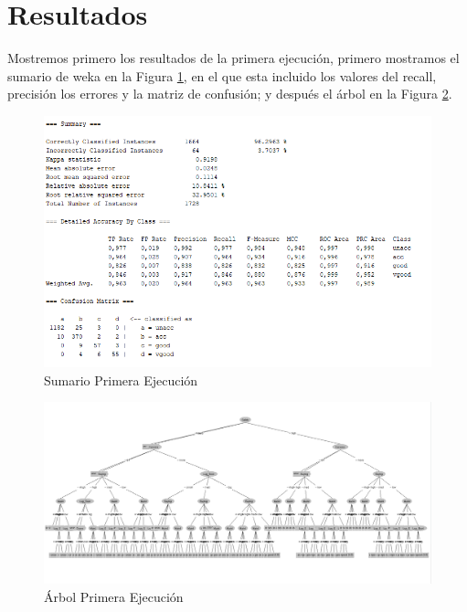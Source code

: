 \documentclass[a4paper, 11pt, twoside, openany, onecolumn, final]{memoir}
\begin{document}
	\section{Resultados}
	Mostremos primero los resultados de la primera ejecución, primero mostramos el sumario de weka en la Figura \ref{SumarioPrimeraEjecucion}, en el que esta incluido los valores del recall, precisión los errores y la matriz de confusión; y después el árbol en la Figura \ref{ArbolPrimeraEjecucion}.
	\begin{figure}
  		\centering
   		\includegraphics{Imagenes/SummarySinEntreNiVal}
  		\caption{Sumario Primera Ejecución}
  		\label{SumarioPrimeraEjecucion}
	\end{figure}	
	
	\begin{figure}
  		\centering
   		\includegraphics[width=1\textwidth]{Imagenes/ArbolSinEntreNiVal}
  		\caption{Árbol Primera Ejecución}
  		\label{ArbolPrimeraEjecucion}
	\end{figure}
	
\end{document}
